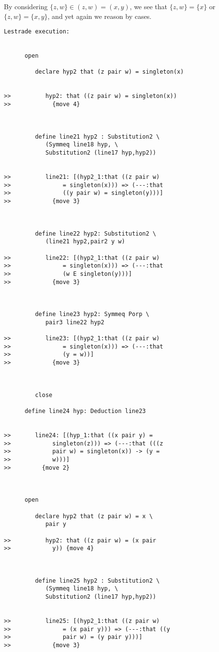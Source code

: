 \documentclass{article}
\begin{document}
By considering $\{z,w\} \in (z,w) = (x,y)$, we see that $\{z,w\} = \{x\}$ or $\{z,w\} = \{x,y\}$, and yet
again we reason by cases.

\begin{verbatim}Lestrade execution:


      open

         declare hyp2 that (z pair w) = singleton(x)


>>          hyp2: that ((z pair w) = singleton(x))
>>            {move 4}



         define line21 hyp2 : Substitution2 \
            (Symmeq line18 hyp, \
            Substitution2 (line17 hyp,hyp2))


>>          line21: [(hyp2_1:that ((z pair w)
>>               = singleton(x))) => (---:that
>>               ((y pair w) = singleton(y)))]
>>            {move 3}



         define line22 hyp2: Substitution2 \
            (line21 hyp2,pair2 y w)

>>          line22: [(hyp2_1:that ((z pair w)
>>               = singleton(x))) => (---:that
>>               (w E singleton(y)))]
>>            {move 3}



         define line23 hyp2: Symmeq Porp \
            pair3 line22 hyp2

>>          line23: [(hyp2_1:that ((z pair w)
>>               = singleton(x))) => (---:that
>>               (y = w))]
>>            {move 3}



         close

      define line24 hyp: Deduction line23


>>       line24: [(hyp_1:that ((x pair y) =
>>            singleton(z))) => (---:that (((z
>>            pair w) = singleton(x)) -> (y =
>>            w)))]
>>         {move 2}



      open

         declare hyp2 that (z pair w) = x \
            pair y

>>          hyp2: that ((z pair w) = (x pair
>>            y)) {move 4}



         define line25 hyp2 : Substitution2 \
            (Symmeq line18 hyp, \
            Substitution2 (line17 hyp,hyp2))


>>          line25: [(hyp2_1:that ((z pair w)
>>               = (x pair y))) => (---:that ((y
>>               pair w) = (y pair y)))]
>>            {move 3}




\end{verbatim}
\end{document}
